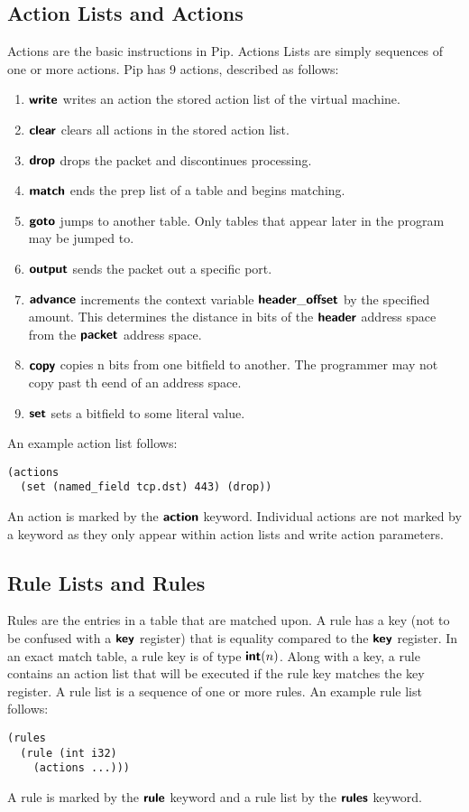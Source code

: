 \subsection{Action Lists and Actions}
Actions are the basic instructions in Pip. Actions Lists are simply sequences of one or more actions. Pip has 9 actions, described as follows: 
\begin{enumerate}
  \item $\bm{\mathsf{{write}}}$ writes an action the stored action list of the virtual machine. 
  \item $\bm{\mathsf{{clear}}}$ clears all actions in the stored action list.
  \item $\bm{\mathsf{{drop}}}$ drops the packet and discontinues processing.
  \item $\bm{\mathsf{{match}}}$ ends the prep list of a table and begins matching.
  \item $\bm{\mathsf{{goto}}}$ jumps to another table. Only tables that appear later in the program may be jumped to.
  \item $\bm{\mathsf{{output}}}$ sends the packet out a specific port.
  \item $\bm{\mathsf{{advance}}}$ increments the context variable $\bm{\mathsf{{header\_offset}}}$ by the specified amount. This determines the distance in bits of the $\bm{\mathsf{{header}}}$ address space from the $\bm{\mathsf{{packet}}}$ address space.
  \item $\bm{\mathsf{{copy}}}$ copies n bits from one bitfield to another. The programmer may not copy past th eend of an address space.
  \item $\bm{\mathsf{{set}}}$ sets a bitfield to some literal value.
\end{enumerate}
An example action list follows:
\begin{lstlisting}
(actions
  (set (named_field tcp.dst) 443) (drop))
\end{lstlisting}
An action is marked by the $\bm{\mathsf{{action}}}$ keyword. Individual actions are not marked by a keyword as they only appear within action lists and write action parameters.

\subsection{Rule Lists and Rules}
Rules are the entries in a table that are matched upon. A rule has a key (not to be confused with a $\bm{\mathsf{{key}}}$ register) that is equality compared to the $\bm{\mathsf{{key}}}$ register. In an exact match table, a rule key is of type $\bm{\mathsf{{int}}}(n)$. Along with a key, a rule contains an action list that will be executed if the rule key matches the key register. A rule list is a sequence of one or more rules. An example rule list follows:
\begin{lstlisting}
(rules
  (rule (int i32)
    (actions ...)))
\end{lstlisting}
A rule is marked by the $\bm{\mathsf{{rule}}}$ keyword and a rule list by the $\bm{\mathsf{{rules}}}$ keyword.

